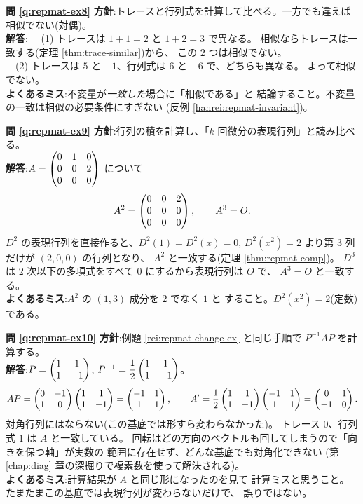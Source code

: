\bigskip
\noindent\textbf{問 \ref{q:repmat-ex8}}\quad
\textbf{方針}:トレースと行列式を計算して比べる。一方でも違えば
相似でない(対偶)。\\
\textbf{解答}:
　(1) トレースは $1 + 1 = 2$ と $1 + 2 = 3$ で異なる。
相似ならトレースは一致する(定理 \ref{thm:trace-similar})から、
この $2$ つは相似でない。\\
　(2) トレースは $5$ と $-1$、行列式は $6$ と $-6$ で、どちらも異なる。
よって相似でない。\\
\textbf{よくあるミス}:不変量が\emph{一致した}場合に「相似である」と
結論すること。不変量の一致は相似の必要条件にすぎない
(反例 \ref{hanrei:repmat-invariant})。

\bigskip
\noindent\textbf{問 \ref{q:repmat-ex9}}\quad
\textbf{方針}:行列の積を計算し、「$k$ 回微分の表現行列」と読み比べる。\\
\textbf{解答}:$A = \begin{pmatrix}0 & 1 & 0 \\ 0 & 0 & 2 \\ 0 & 0 & 0\end{pmatrix}$ について
\[
A^2 = \begin{pmatrix}0 & 0 & 2 \\ 0 & 0 & 0 \\ 0 & 0 & 0\end{pmatrix}, \qquad A^3 = O.
\]
$D^2$ の表現行列を直接作ると、$D^2(1) = D^2(x) = 0$,
$D^2(x^2) = 2$ より第 $3$ 列だけが $(2, 0, 0)$ の行列となり、
$A^2$ と一致する(定理 \ref{thm:repmat-comp})。
$D^3$ は $2$ 次以下の多項式をすべて $0$ にするから表現行列は $O$ で、
$A^3 = O$ と一致する。\\
\textbf{よくあるミス}:$A^2$ の $(1, 3)$ 成分を $2$ でなく $1$ と
すること。$D^2(x^2) = 2$(定数)である。

\bigskip
\noindent\textbf{問 \ref{q:repmat-ex10}}\quad
\textbf{方針}:例題 \ref{rei:repmat-change-ex} と同じ手順で
$P^{-1}AP$ を計算する。\\
\textbf{解答}:$P = \begin{pmatrix}1 & 1 \\ 1 & -1\end{pmatrix}$,
$P^{-1} = \dfrac{1}{2}\begin{pmatrix}1 & 1 \\ 1 & -1\end{pmatrix}$。
\[
AP = \begin{pmatrix}0 & -1 \\ 1 & 0\end{pmatrix}\begin{pmatrix}1 & 1 \\ 1 & -1\end{pmatrix} = \begin{pmatrix}-1 & 1 \\ 1 & 1\end{pmatrix},
\qquad
A' = \frac{1}{2}\begin{pmatrix}1 & 1 \\ 1 & -1\end{pmatrix}\begin{pmatrix}-1 & 1 \\ 1 & 1\end{pmatrix}
= \begin{pmatrix}0 & 1 \\ -1 & 0\end{pmatrix}.
\]
対角行列にはならない(この基底では形すら変わらなかった)。
トレース $0$、行列式 $1$ は $A$ と一致している。
回転はどの方向のベクトルも回してしまうので「向きを保つ軸」が実数の
範囲に存在せず、どんな基底でも対角化できない
(第 \ref{chap:diag} 章の深掘りで複素数を使って解決される)。\\
\textbf{よくあるミス}:計算結果が $A$ と同じ形になったのを見て
計算ミスと思うこと。たまたまこの基底では表現行列が変わらないだけで、
誤りではない。

